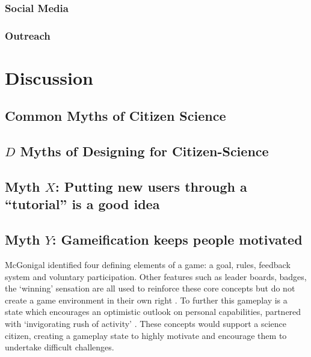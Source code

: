 \documentclass{sigchi}
\begin{document}



\subsubsection{Social Media}

\subsubsection{Outreach}

\section{Discussion}

\subsection{Common Myths of Citizen Science}
\subsection{$D$ Myths of Designing for Citizen-Science}
\subsection{Myth $X$: Putting new users through a ``tutorial'' is a good idea}
\subsection{Myth $Y$: Gameification keeps people motivated}
McGonigal identified four defining elements of a game: a goal, rules, feedback system and voluntary participation. Other features such as leader boards, badges, the `winning' sensation are all used to reinforce these core concepts but do not create a game environment in their own right \cite{mcgonigal2011reality}. To further this gameplay is a state which encourages an optimistic outlook on personal capabilities, partnered with `invigorating rush of activity' \cite{mcgonigal2011reality}. These concepts would support a science citizen, creating a gameplay state to highly motivate and encourage them to undertake difficult challenges. 
\end{document}
